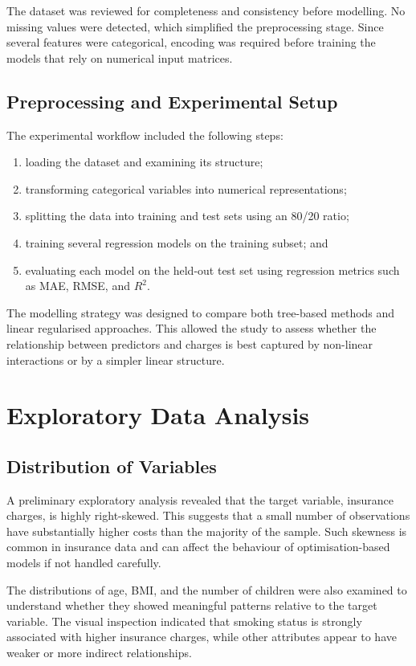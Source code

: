 The dataset was reviewed for completeness and consistency before modelling. No missing values were detected, which simplified the preprocessing stage. Since several features were categorical, encoding was required before training the models that rely on numerical input matrices.

\section{Preprocessing and Experimental Setup}
The experimental workflow included the following steps:
\begin{enumerate}
  \item loading the dataset and examining its structure;
  \item transforming categorical variables into numerical representations;
  \item splitting the data into training and test sets using an 80/20 ratio;
  \item training several regression models on the training subset; and
  \item evaluating each model on the held-out test set using regression metrics such as MAE, RMSE, and $R^2$.
\end{enumerate}

The modelling strategy was designed to compare both tree-based methods and linear regularised approaches. This allowed the study to assess whether the relationship between predictors and charges is best captured by non-linear interactions or by a simpler linear structure.

\chapter{Exploratory Data Analysis}
\section{Distribution of Variables}
A preliminary exploratory analysis revealed that the target variable, insurance charges, is highly right-skewed. This suggests that a small number of observations have substantially higher costs than the majority of the sample. Such skewness is common in insurance data and can affect the behaviour of optimisation-based models if not handled carefully.

The distributions of age, BMI, and the number of children were also examined to understand whether they showed meaningful patterns relative to the target variable. The visual inspection indicated that smoking status is strongly associated with higher insurance charges, while other attributes appear to have weaker or more indirect relationships.


